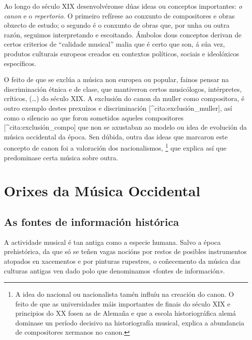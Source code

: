 \documentclass[a4paper, twoside]{templates/ociamthesis}
\theoremstyle{definition}
\theoremstyle{definition}
\theoremstyle{definition}
\theoremstyle{definition}
\theoremstyle{remark}
\begin{document}
Ao longo do século XIX desenvolvéronse dúas ideas ou conceptos importantes: \emph{o canon} e o \emph{repertorio}. O primeiro refírese ao conxunto de compositores e obras obxecto de estudo; o segundo é o conxunto de obras que, por unha ou outra razón, seguimos interpretando e escoitando. Ámbolos dous conceptos derivan de certos criterios de ``calidade musical'' malia que é certo que son, á súa vez, produtos culturais europeos creados en contextos políticos, sociais e ideolóxicos específicos.

O feito de que se exclúa a música non europea ou popular, fainos pensar na discriminación étnica e de clase, que mantiveron certos musicólogos, intérpretes, críticos, (\ldots) do século XIX. A exclusión do canon da muller como compositora, é outro exemplo destes prexuízos e discriminación {[}\^{}cita:exclusión\_muller{]}, así como o silencio ao que foron sometidos aqueles compositores {[}\^{}cita:exclusión\_compo{]} que non se axustaban ao modelo ou idea de evolución da música occidental da época. Sen dúbida, outra das ideas que marcaron este concepto de canon foi a valoración dos nacionalismos, \footnote{A idea do nacional ou nacionalista tamén influíu na creación do canon. O feito de que as universidades máis importantes de finais do século XIX e principios do XX fosen as de Alemaña e que a escola historiográfica alemá dominase un período decisivo na historiografía musical, explica a abundancia de compositores xermanos no canon.} que explica así que predominase certa música sobre outra.

\hypertarget{orixes-da-muxfasica-occidental}{%
\chapter{Orixes da Música Occidental}\label{orixes-da-muxfasica-occidental}}

\minitoc 

\hypertarget{as-fontes-de-informaciuxf3n-histuxf3rica}{%
\section*{As fontes de información histórica}\label{as-fontes-de-informaciuxf3n-histuxf3rica}}

A actividade musical é tan antiga como a especie humana. Salvo a época prehistórica, da que só se teñen vagas nocións por restos de posibles instrumentos atopados en xacementos e por pinturas rupestres, o coñecemento da música das culturas antigas ven dado polo que denominamos «fontes de información».
\end{document}
